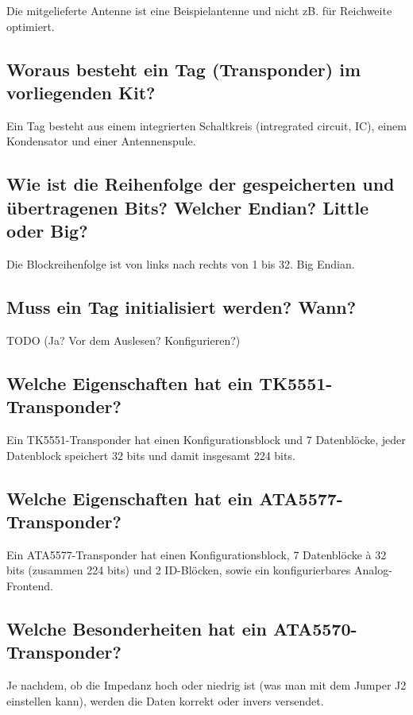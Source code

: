 \documentclass[paper=a4,fontsize=11pt,headsepline,footsepline,parskip=half]{scrartcl}
\begin{document}
Die mitgelieferte Antenne ist eine Beispielantenne und nicht zB. für Reichweite optimiert.

\subsection{Woraus besteht ein Tag (Transponder) im vorliegenden Kit?}

Ein Tag besteht aus einem integrierten Schaltkreis (intregrated circuit, IC), einem Kondensator und einer Antennenspule.

\subsection{Wie ist die Reihenfolge der gespeicherten und übertragenen Bits? Welcher Endian? Little oder Big?}

Die Blockreihenfolge ist von links nach rechts von 1 bis 32. Big Endian.

\subsection{Muss ein Tag initialisiert werden? Wann?}

TODO (Ja? Vor dem Auslesen? Konfigurieren?)

\subsection{Welche Eigenschaften hat ein TK5551-Transponder?}

Ein TK5551-Transponder hat einen Konfigurationsblock und 7 Datenblöcke, jeder Datenblock speichert 32 bits und damit insgesamt 224 bits.

\subsection{Welche Eigenschaften hat ein ATA5577-Transponder?}

Ein ATA5577-Transponder hat einen Konfigurationsblock, 7 Datenblöcke à 32 bits (zusammen 224 bits) und 2 ID-Blöcken, sowie ein konfigurierbares
Analog-Frontend.

\subsection{Welche Besonderheiten hat ein ATA5570-Transponder?}

Je nachdem, ob die Impedanz hoch oder niedrig ist (was man mit dem Jumper J2 einstellen kann), werden die Daten korrekt oder invers versendet.
\end{document}

